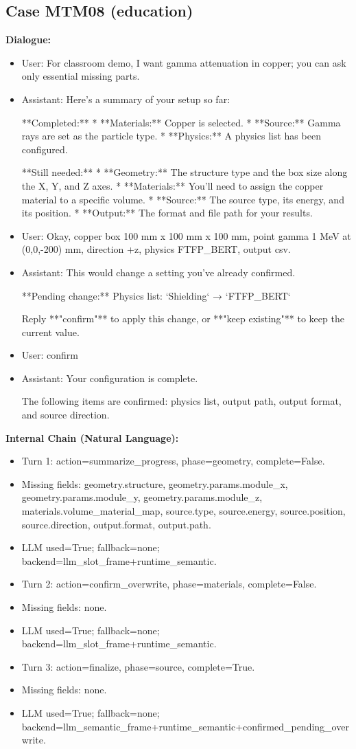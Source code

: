 \documentclass[11pt]{ctexart}
\begin{document}
\subsection{Case MTM08 (education)}
\textbf{Dialogue:}
\begin{itemize}
\item User: For classroom demo, I want gamma attenuation in copper; you can ask only essential missing parts.
\item Assistant: Here's a summary of your setup so far:

**Completed:**
*   **Materials:** Copper is selected.
*   **Source:** Gamma rays are set as the particle type.
*   **Physics:** A physics list has been configured.

**Still needed:**
*   **Geometry:** The structure type and the box size along the X, Y, and Z axes.
*   **Materials:** You'll need to assign the copper material to a specific volume.
*   **Source:** The source type, its energy, and its position.
*   **Output:** The format and file path for your results.
\item User: Okay, copper box 100 mm x 100 mm x 100 mm, point gamma 1 MeV at (0,0,-200) mm, direction +z, physics FTFP\_BERT, output csv.
\item Assistant: This would change a setting you've already confirmed.

**Pending change:**  
Physics list: `Shielding` → `FTFP\_BERT`

Reply **"confirm"** to apply this change, or **"keep existing"** to keep the current value.
\item User: confirm
\item Assistant: Your configuration is complete.

The following items are confirmed: physics list, output path, output format, and source direction.
\end{itemize}
\textbf{Internal Chain (Natural Language):}
\begin{itemize}
\item Turn 1: action=summarize\_progress, phase=geometry, complete=False.
\item Missing fields: geometry.structure, geometry.params.module\_x, geometry.params.module\_y, geometry.params.module\_z, materials.volume\_material\_map, source.type, source.energy, source.position, source.direction, output.format, output.path.
\item LLM used=True; fallback=none; backend=llm\_slot\_frame+runtime\_semantic.
\item Turn 2: action=confirm\_overwrite, phase=materials, complete=False.
\item Missing fields: none.
\item LLM used=True; fallback=none; backend=llm\_slot\_frame+runtime\_semantic.
\item Turn 3: action=finalize, phase=source, complete=True.
\item Missing fields: none.
\item LLM used=True; fallback=none; backend=llm\_semantic\_frame+runtime\_semantic+confirmed\_pending\_overwrite.
\end{itemize}
\end{document}
